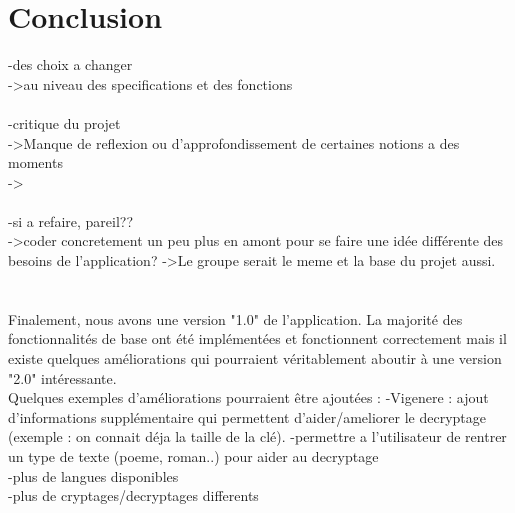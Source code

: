 \documentclass[a4]{article}
\begin{document}
	
	\section{Conclusion}
	-des choix a changer \\
	->au niveau des specifications et des fonctions \\ \\
	
	-critique du projet \\
	->Manque de reflexion ou d'approfondissement de certaines notions a des moments \\
	-> \\ \\
	
	
		
	-si a refaire, pareil?? \\
	->coder concretement un peu plus en amont pour se faire une idée différente des besoins de l'application?
	->Le groupe serait le meme et la base du projet aussi. \\ \\ \\
	
	
	Finalement, nous avons une version "1.0" de l’application. La majorité des fonctionnalités
de base ont été implémentées et fonctionnent correctement mais il existe quelques
améliorations qui pourraient véritablement aboutir à une version "2.0" intéressante. \\
Quelques exemples d'améliorations pourraient être ajoutées :
-Vigenere : ajout d'informations supplémentaire qui permettent d'aider/ameliorer le decryptage 
(exemple : on connait déja la taille de la clé).
-permettre a l'utilisateur de rentrer un type de texte (poeme, roman..) pour aider au decryptage \\
-plus de langues disponibles \\
-plus de cryptages/decryptages differents \\

\\ \\ \\

	
	
\end{document}

